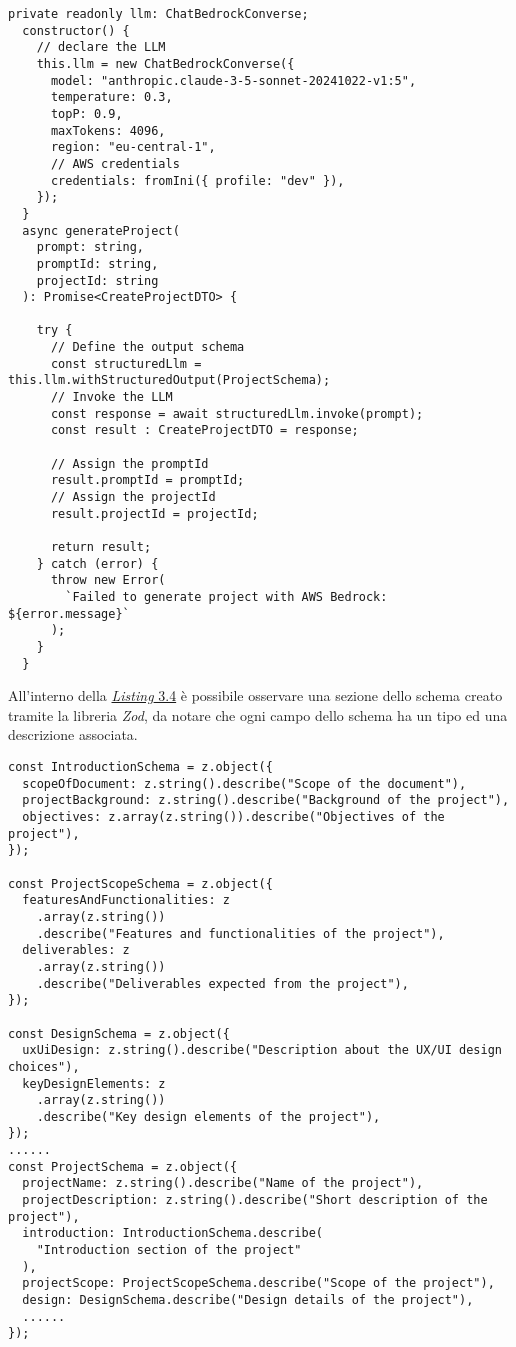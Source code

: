 \begin{lstlisting}[caption={Dichiarazione \gls{llm} e sua invocazione}, label={lst:funzione-generazione-progetto}]
private readonly llm: ChatBedrockConverse;
  constructor() {  
    // declare the LLM
    this.llm = new ChatBedrockConverse({
      model: "anthropic.claude-3-5-sonnet-20241022-v1:5",
      temperature: 0.3,
      topP: 0.9,
      maxTokens: 4096,
      region: "eu-central-1",
      // AWS credentials
      credentials: fromIni({ profile: "dev" }), 
    });
  }
  async generateProject(
    prompt: string,
    promptId: string,
    projectId: string
  ): Promise<CreateProjectDTO> {

    try {
      // Define the output schema
      const structuredLlm = this.llm.withStructuredOutput(ProjectSchema); 
      // Invoke the LLM
      const response = await structuredLlm.invoke(prompt); 
      const result : CreateProjectDTO = response;

      // Assign the promptId
      result.promptId = promptId; 
      // Assign the projectId
      result.projectId = projectId; 

      return result;
    } catch (error) {
      throw new Error(
        `Failed to generate project with AWS Bedrock: ${error.message}`
      );
    }
  }
\end{lstlisting}
\pagebreak
\noindent All'interno della {\hyperref[lst:funzione-generazione-progetto]{\textit{Listing} 3.4}} è possibile osservare una sezione dello schema creato tramite la libreria \textit{Zod}, da notare che ogni campo dello schema ha un tipo ed una descrizione associata. 

\begin{lstlisting}[caption={Schema \textit{Zod} dell'output dell'\gls{llm}}, label={lst:schema-zod}]
const IntroductionSchema = z.object({
  scopeOfDocument: z.string().describe("Scope of the document"),
  projectBackground: z.string().describe("Background of the project"),
  objectives: z.array(z.string()).describe("Objectives of the project"),
});

const ProjectScopeSchema = z.object({
  featuresAndFunctionalities: z
    .array(z.string())
    .describe("Features and functionalities of the project"),
  deliverables: z
    .array(z.string())
    .describe("Deliverables expected from the project"),
});

const DesignSchema = z.object({
  uxUiDesign: z.string().describe("Description about the UX/UI design choices"),
  keyDesignElements: z
    .array(z.string())
    .describe("Key design elements of the project"),
});
......
const ProjectSchema = z.object({
  projectName: z.string().describe("Name of the project"),
  projectDescription: z.string().describe("Short description of the project"),
  introduction: IntroductionSchema.describe(
    "Introduction section of the project"
  ),
  projectScope: ProjectScopeSchema.describe("Scope of the project"),
  design: DesignSchema.describe("Design details of the project"),
  ......
});
\end{lstlisting}


